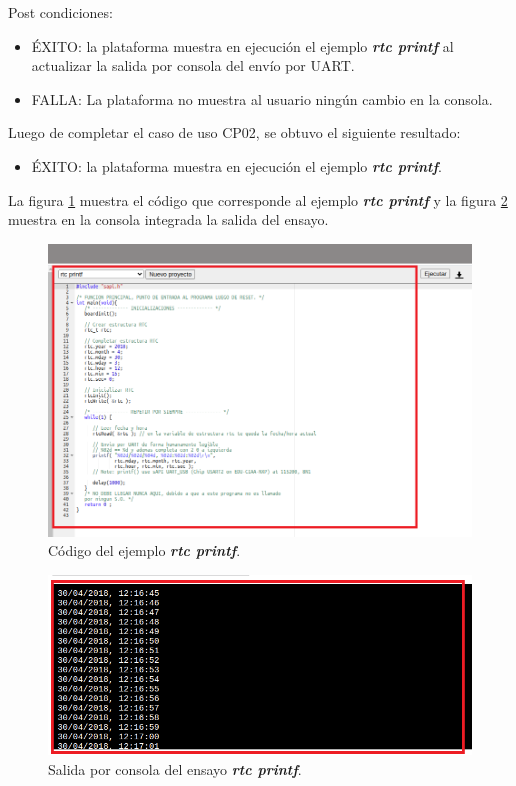 Post condiciones:
\begin{itemize}
	\item ÉXITO: la plataforma muestra en ejecución el ejemplo \textit{\textbf{rtc printf}} al actualizar la salida por consola del envío por UART.
	\item FALLA: La plataforma no muestra al usuario ningún cambio en la consola.
\end{itemize}


Luego de completar el caso de uso CP02, se obtuvo el siguiente resultado: 

\begin{itemize}
	\item ÉXITO: la plataforma muestra en ejecución el ejemplo \textit{\textbf{rtc printf}}.
\end{itemize}


La figura \ref{fig:rtcprintf1} muestra el código que corresponde al ejemplo \textit{\textbf{rtc printf}}
y la figura \ref{fig:rtcprintf2} muestra en la consola integrada la salida del ensayo. 

\begin{figure}[ht]
	\centering
	\includegraphics[scale=.40]{./Figures/rtcprintf1.png}
	\caption{Código  del ejemplo \textit{\textbf{rtc printf}}.}
	\label{fig:rtcprintf1}
\end{figure}

\begin{figure}[ht]
	\centering
	\includegraphics[scale=.44]{./Figures/rtcprintf2.png}
	\caption{Salida por consola del ensayo \textit{\textbf{rtc printf}}.}
	\label{fig:rtcprintf2}
\end{figure}

